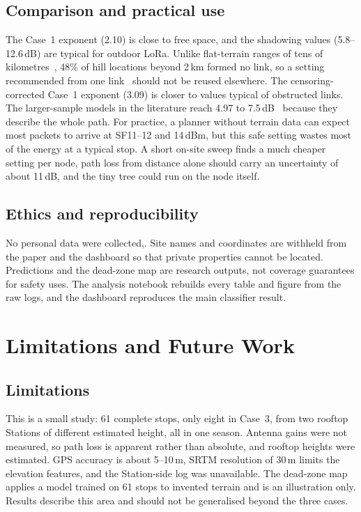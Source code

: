 \documentclass[conference]{IEEEtran}
\newcommand{\dBm}{\,dBm\xspace}
\newcommand{\dB}{\,dB\xspace}
\begin{document}
\subsection{Comparison and practical use}
The Case~1 exponent (2.10) is close to free space, and the shadowing values (5.8--12.6\dB) are typical for outdoor LoRa. Unlike flat-terrain ranges of tens of kilometres~\cite{petajajarvi2015}, 48\% of hill locations beyond 2\,km formed no link, so a setting recommended from one link~\cite{pokharel2024} should not be reused elsewhere. The censoring-corrected Case~1 exponent (3.09) is closer to values typical of obstructed links. The larger-sample models in the literature reach 4.97 to 7.5\dB~\cite{ojo2024,ethier2024} because they describe the whole path. For practice, a planner without terrain data can expect most packets to arrive at SF11--12 and 14\dBm, but this safe setting wastes most of the energy at a typical stop. A short on-site sweep finds a much cheaper setting per node, path loss from distance alone should carry an uncertainty of about 11\dB, and the tiny tree could run on the node itself.

\subsection{Ethics and reproducibility}
No personal data were collected,. Site names and coordinates are withheld from the paper and the dashboard so that private properties cannot be located. Predictions and the dead-zone map are research outputs, not coverage guarantees for safety uses. The analysis notebook rebuilds every table and figure from the raw logs, and the dashboard reproduces the main classifier result.

\section{Limitations and Future Work}\label{sec:limits}
\subsection{Limitations}
This is a small study: 61 complete stops, only eight in Case~3, from two rooftop Stations of different estimated height, all in one season. Antenna gains were not measured, so path loss is apparent rather than absolute, and rooftop heights were estimated. GPS accuracy is about 5--10\,m, SRTM resolution of 30\,m limits the elevation features, and the Station-side log was unavailable. The dead-zone map applies a model trained on 61 stops to invented terrain and is an illustration only. Results describe this area and should not be generalised beyond the three cases.
\end{document}
